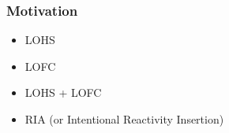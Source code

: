 \begin{frame}[fragile]
  \frametitle{Motivation}
  \begin{itemize}
    \item LOHS
    \item LOFC
    \item LOHS + LOFC
    \item RIA (or Intentional Reactivity Insertion)
  \end{itemize}

\end{frame}
